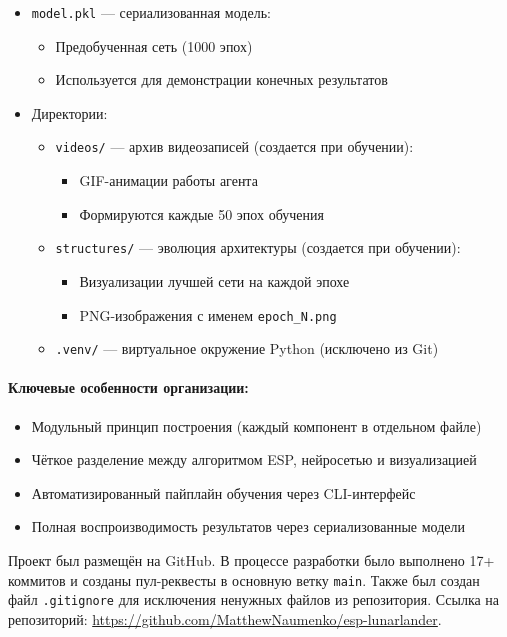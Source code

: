 \documentclass[a4paper,12pt]{article}
\begin{document}
\begin{itemize}
	\item \texttt{model.pkl} --- сериализованная модель:
	\begin{itemize}
		\item Предобученная сеть (1000 эпох)
		\item Используется для демонстрации конечных результатов
	\end{itemize}
	
	\item Директории:
	\begin{itemize}
		\item \texttt{videos/} --- архив видеозаписей (создается при обучении):
		\begin{itemize}
			\item GIF-анимации работы агента
			\item Формируются каждые 50 эпох обучения
		\end{itemize}
		\item \texttt{structures/} --- эволюция архитектуры (создается при обучении):
		\begin{itemize}
			\item Визуализации лучшей сети на каждой эпохе
			\item PNG-изображения с именем \texttt{epoch\_N.png}
		\end{itemize}
		\item \texttt{.venv/} --- виртуальное окружение Python (исключено из Git)
	\end{itemize}
\end{itemize}

\paragraph{Ключевые особенности организации:}
\begin{itemize}
	\item Модульный принцип построения (каждый компонент в отдельном файле)
	\item Чёткое разделение между алгоритмом ESP, нейросетью и визуализацией
	\item Автоматизированный пайплайн обучения через CLI-интерфейс
	\item Полная воспроизводимость результатов через сериализованные модели
\end{itemize}

Проект был размещён на GitHub. В процессе разработки было выполнено 17+ коммитов и созданы пул-реквесты в основную ветку \texttt{main}. Также был создан файл \texttt{.gitignore} для исключения ненужных файлов из репозитория.  
Ссылка на репозиторий: \url{https://github.com/MatthewNaumenko/esp-lunarlander}.
\end{document}
